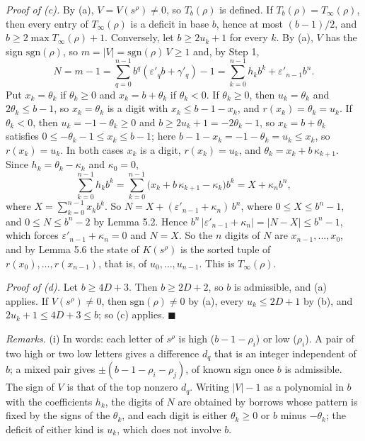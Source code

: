 \documentclass[11pt,letterpaper]{article}
\theoremstyle{paperstyle}
\theoremstyle{paperstyledef}
\theoremstyle{paperstylerem}
\begin{document}
\emph{Proof of (c).} By (a), \(V = V(s^\rho) \ne 0\), so \(T_b(\rho)\) is defined. If \(T_b(\rho) = T_\infty(\rho)\), then every entry of \(T_\infty(\rho)\) is a deficit in base \(b\), hence at most \((b-1)/2\), and \(b \ge 2\max T_\infty(\rho) + 1\). Conversely, let \(b \ge 2u_k + 1\) for every \(k\). By (a), \(V\) has the sign \(\mathrm{sgn}(\rho)\), so \(m = |V| = \mathrm{sgn}(\rho)\, V \ge 1\) and, by Step 1, \[N = m - 1 = \sum_{q=0}^{n-1} b^q (\varepsilon'_q b + \gamma'_q) - 1 = \sum_{k=0}^{n-1} h_k b^k + \varepsilon'_{n-1} b^n.\] Put \(x_k = \theta_k\) if \(\theta_k \ge 0\) and \(x_k = b + \theta_k\) if \(\theta_k < 0\). If \(\theta_k \ge 0\), then \(u_k = \theta_k\) and \(2\theta_k \le b - 1\), so \(x_k = \theta_k\) is a digit with \(x_k \le b - 1 - x_k\), and \(r(x_k) = \theta_k = u_k\). If \(\theta_k < 0\), then \(u_k = -1 - \theta_k \ge 0\) and \(b \ge 2u_k + 1 = -2\theta_k - 1\), so \(x_k = b + \theta_k\) satisfies \(0 \le -\theta_k - 1 \le x_k \le b - 1\); here \(b - 1 - x_k = -1 - \theta_k = u_k \le x_k\), so \(r(x_k) = u_k\). In both cases \(x_k\) is a digit, \(r(x_k) = u_k\), and \(\theta_k = x_k + b\,\kappa_{k+1}\). Since \(h_k = \theta_k - \kappa_k\) and \(\kappa_0 = 0\), \[\sum_{k=0}^{n-1} h_k b^k = \sum_{k=0}^{n-1} \bigl(x_k + b\,\kappa_{k+1} - \kappa_k\bigr) b^k = X + \kappa_n b^n,\] where \(X = \sum_{k=0}^{n-1} x_k b^k\). So \(N = X + (\varepsilon'_{n-1} + \kappa_n)\, b^n\), where \(0 \le X \le b^n - 1\), and \(0 \le N \le b^n - 2\) by Lemma 5.2. Hence \(b^n\, |\varepsilon'_{n-1} + \kappa_n| = |N - X| \le b^n - 1\), which forces \(\varepsilon'_{n-1} + \kappa_n = 0\) and \(N = X\). So the \(n\) digits of \(N\) are \(x_{n-1}, \dots, x_0\), and by Lemma 5.6 the state of \(K(s^\rho)\) is the sorted tuple of \(r(x_0), \dots, r(x_{n-1})\), that is, of \(u_0, \dots, u_{n-1}\). This is \(T_\infty(\rho)\).

\emph{Proof of (d).} Let \(b \ge 4D + 3\). Then \(b \ge 2D + 2\), so \(b\) is admissible, and (a) applies. If \(V(s^\rho) \ne 0\), then \(\mathrm{sgn}(\rho) \ne 0\) by (a), every \(u_k \le 2D + 1\) by (b), and \(2u_k + 1 \le 4D + 3 \le b\); so (c) applies. \(\blacksquare\)

\emph{Remarks.} (i) In words: each letter of \(s^\rho\) is high (\(b-1-\rho_i\)) or low (\(\rho_i\)). A pair of two high or two low letters gives a difference \(d_q\) that is an integer independent of \(b\); a mixed pair gives \(\pm(b - 1 - \rho_i - \rho_j)\), of known sign once \(b\) is admissible. The sign of \(V\) is that of the top nonzero \(d_q\). Writing \(|V| - 1\) as a polynomial in \(b\) with the coefficients \(h_k\), the digits of \(N\) are obtained by borrows whose pattern is fixed by the signs of the \(\theta_k\), and each digit is either \(\theta_k \ge 0\) or \(b\) minus \(-\theta_k\); the deficit of either kind is \(u_k\), which does not involve \(b\).
\end{document}

